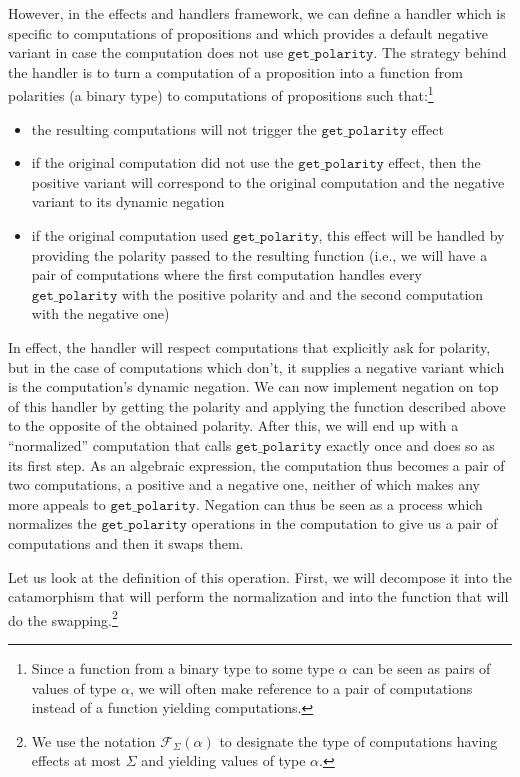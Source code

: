 \documentclass[a4paper,11pt,DIV=12]{scrartcl}
\begin{document}
However, in the effects and handlers framework, we can define a handler
which is specific to computations of propositions and which provides a
default negative variant in case the computation does not use
$\texttt{get\_polarity}$. The strategy behind the handler is to turn a
computation of a proposition into a function from polarities (a binary
type) to computations of propositions such that:\footnote{Since a function
  from a binary type to some type $\alpha$ can be seen as pairs of values
  of type $\alpha$, we will often make reference to a pair of computations
  instead of a function yielding computations.}

\begin{itemize}
\item the resulting computations will not trigger the
  $\texttt{get\_polarity}$ effect
\item if the original computation did not use the $\texttt{get\_polarity}$
  effect, then the positive variant will correspond to the original
  computation and the negative variant to its dynamic negation
\item if the original computation used $\texttt{get\_polarity}$, this
  effect will be handled by providing the polarity passed to the resulting
  function (i.e., we will have a pair of computations where the first
  computation handles every $\texttt{get\_polarity}$ with the positive
  polarity and and the second computation with the negative one)
\end{itemize}

In effect, the handler will respect computations that explicitly ask for
polarity, but in the case of computations which don't, it supplies a
negative variant which is the computation's dynamic negation. We can now
implement negation on top of this handler by getting the polarity and
applying the function described above to the opposite of the obtained
polarity. After this, we will end up with a ``normalized'' computation that
calls $\texttt{get\_polarity}$ exactly once and does so as its first
step. As an algebraic expression, the computation thus becomes a pair of
two computations, a positive and a negative one, neither of which makes any
more appeals to $\texttt{get\_polarity}$. Negation can thus be seen as a
process which normalizes the $\texttt{get\_polarity}$ operations in the
computation to give us a pair of computations and then it swaps them.

Let us look at the definition of this operation. First, we will decompose
it into the catamorphism that will perform the normalization and into the
function that will do the swapping.\footnote{We use the notation
  $\mathcal{F}_\Sigma(\alpha)$ to designate the type of computations having
  effects at most $\Sigma$ and yielding values of type $\alpha$.}
\end{document}
